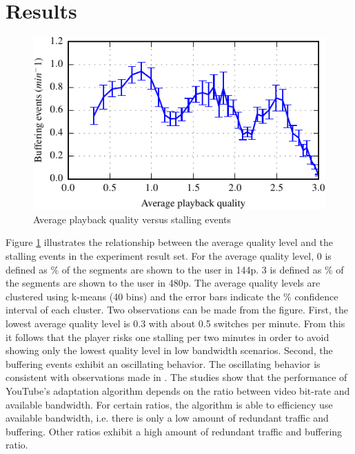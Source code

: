 
\section{Results}
\label{sec:results}

\begin{figure}[t]
\centering
\includegraphics[width=\columnwidth]{figs/33qualityvstalling}%
\caption{Average playback quality versus stalling events}
\label{fig:qualityvsstalling}%
\end{figure}

Figure \ref{fig:qualityvsstalling} illustrates the relationship between the average quality level and the stalling events in the experiment result set.
For the average quality level, 0 is defined as \unit[100]{\%} of the segments are shown to the user in 144p. 3 is defined as \unit[100]{\%} of the segments are shown to the user in 480p.
The average quality levels are clustered using k-means (40 bins) and the error bars indicate the \unit[95]{\%} confidence interval of each cluster.
Two observations can be made from the figure. 
First, the lowest average quality level is 0.3 with about 0.5 switches per minute.
From this it follows that the player risks one stalling per two minutes in order to avoid showing only the lowest quality level in low bandwidth scenarios.
Second, the buffering events exhibit an oscillating behavior.
The oscillating behavior is consistent with observations made in \cite{sieber16sacrificing, casas2012youtube}.
The studies show that the performance of YouTube's adaptation algorithm depends on the ratio between video bit-rate and available bandwidth.
For certain ratios, the algorithm is able to efficiency use available bandwidth, i.e. there is only a low amount of redundant traffic and buffering.
Other ratios exhibit a high amount of redundant traffic and buffering ratio.

